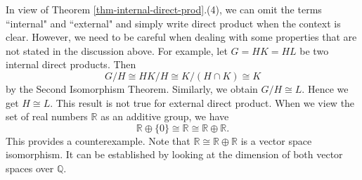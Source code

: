 \begin{remark}
	In view of Theorem \ref{thm-internal-direct-prod}.(4), we can omit the terms ``internal" and ``external" and simply write direct product when the context is clear. However, we need to be careful when dealing with some properties that are not stated in the discussion above. For example, let $G =HK = HL$ be two internal direct products. Then 
	\begin{equation*}
		G/H \cong HK/H \cong K/(H\cap K) \cong K
	\end{equation*}
	by the Second Isomorphism Theorem. Similarly, we obtain $G/H \cong L$. Hence we get $H\cong L$. This result is not true for external direct product. When we view the set of real numbers $\mathbb{R}$ as an additive group, we have
	\begin{equation*}
		\mathbb{R} \oplus \{0\} \cong \mathbb{R} \cong \mathbb{R} \oplus \mathbb{R}.
	\end{equation*}
	This provides a counterexample. Note that $\mathbb{R} \cong \mathbb{R} \oplus \mathbb{R}$ is a vector space isomorphism. It can be established by looking at the dimension of both vector spaces over $\mathbb{Q}$.
\end{remark}

